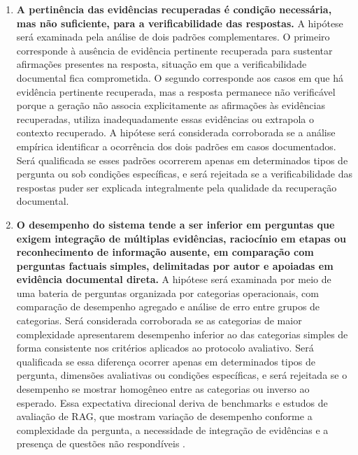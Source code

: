 \begin{enumerate}[label=\textbf{H\arabic*.}]
  \item \textbf{A pertinência das evidências recuperadas é condição necessária, mas não suficiente, para a verificabilidade das respostas.} A hipótese será examinada pela análise de dois padrões complementares. O primeiro corresponde à ausência de evidência pertinente recuperada para sustentar afirmações presentes na resposta, situação em que a verificabilidade documental fica comprometida. O segundo corresponde aos casos em que há evidência pertinente recuperada, mas a resposta permanece não verificável porque a geração não associa explicitamente as afirmações às evidências recuperadas, utiliza inadequadamente essas evidências ou extrapola o contexto recuperado. A hipótese será considerada corroborada se a análise empírica identificar a ocorrência dos dois padrões em casos documentados. Será qualificada se esses padrões ocorrerem apenas em determinados tipos de pergunta ou sob condições específicas, e será rejeitada se a verificabilidade das respostas puder ser explicada integralmente pela qualidade da recuperação documental.
  \item \textbf{O desempenho do sistema tende a ser inferior em perguntas que exigem integração de múltiplas evidências, raciocínio em etapas ou reconhecimento de informação ausente, em comparação com perguntas factuais simples, delimitadas por autor e apoiadas em evidência documental direta.} A hipótese será examinada por meio de uma bateria de perguntas organizada por categorias operacionais, com comparação de desempenho agregado e análise de erro entre grupos de categorias. Será considerada corroborada se as categorias de maior complexidade apresentarem desempenho inferior ao das categorias simples de forma consistente nos critérios aplicados ao protocolo avaliativo. Será qualificada se essa diferença ocorrer apenas em determinados tipos de pergunta, dimensões avaliativas ou condições específicas, e será rejeitada se o desempenho se mostrar homogêneo entre as categorias ou inverso ao esperado. Essa expectativa direcional deriva de benchmarks e estudos de avaliação de RAG, que mostram variação de desempenho conforme a complexidade da pergunta, a necessidade de integração de evidências e a presença de questões não respondíveis \parencite{saadFalconEtAl2024ares,esEtAl2023ragas,zhuEtAl2025rageval,pipitoneAlami2024legalbenchRag}.

\end{enumerate}

